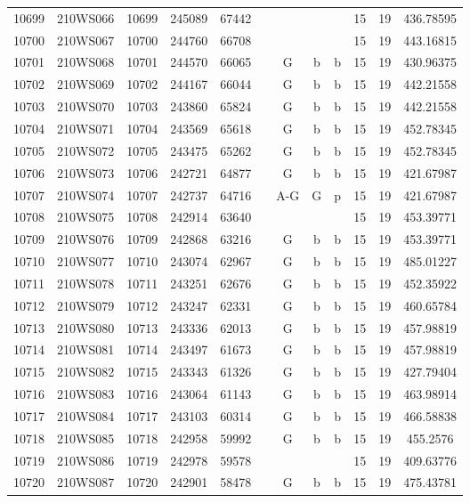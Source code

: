 \begin{tabular}{|*{12}{c|}}
10699 & 210WS066 & 10699 & 245089 & 67442 &  &  &  &  & 15 & 19 & 436.78595 \\ 
10700 & 210WS067 & 10700 & 244760 & 66708 &  &  &  &  & 15 & 19 & 443.16815 \\ 
10701 & 210WS068 & 10701 & 244570 & 66065 &  & G & b & b & 15 & 19 & 430.96375 \\ 
10702 & 210WS069 & 10702 & 244167 & 66044 &  & G & b & b & 15 & 19 & 442.21558 \\ 
10703 & 210WS070 & 10703 & 243860 & 65824 &  & G & b & b & 15 & 19 & 442.21558 \\ 
10704 & 210WS071 & 10704 & 243569 & 65618 &  & G & b & b & 15 & 19 & 452.78345 \\ 
10705 & 210WS072 & 10705 & 243475 & 65262 &  & G & b & b & 15 & 19 & 452.78345 \\ 
10706 & 210WS073 & 10706 & 242721 & 64877 &  & G & b & b & 15 & 19 & 421.67987 \\ 
10707 & 210WS074 & 10707 & 242737 & 64716 &  & A-G & G & p & 15 & 19 & 421.67987 \\ 
10708 & 210WS075 & 10708 & 242914 & 63640 &  &  &  &  & 15 & 19 & 453.39771 \\ 
10709 & 210WS076 & 10709 & 242868 & 63216 &  & G & b & b & 15 & 19 & 453.39771 \\ 
10710 & 210WS077 & 10710 & 243074 & 62967 &  & G & b & b & 15 & 19 & 485.01227 \\ 
10711 & 210WS078 & 10711 & 243251 & 62676 &  & G & b & b & 15 & 19 & 452.35922 \\ 
10712 & 210WS079 & 10712 & 243247 & 62331 &  & G & b & b & 15 & 19 & 460.65784 \\ 
10713 & 210WS080 & 10713 & 243336 & 62013 &  & G & b & b & 15 & 19 & 457.98819 \\ 
10714 & 210WS081 & 10714 & 243497 & 61673 &  & G & b & b & 15 & 19 & 457.98819 \\ 
10715 & 210WS082 & 10715 & 243343 & 61326 &  & G & b & b & 15 & 19 & 427.79404 \\ 
10716 & 210WS083 & 10716 & 243064 & 61143 &  & G & b & b & 15 & 19 & 463.98914 \\ 
10717 & 210WS084 & 10717 & 243103 & 60314 &  & G & b & b & 15 & 19 & 466.58838 \\ 
10718 & 210WS085 & 10718 & 242958 & 59992 &  & G & b & b & 15 & 19 & 455.2576 \\ 
10719 & 210WS086 & 10719 & 242978 & 59578 &  &  &  &  & 15 & 19 & 409.63776 \\ 
10720 & 210WS087 & 10720 & 242901 & 58478 &  & G & b & b & 15 & 19 & 475.43781 \\ 

\end{tabular}
